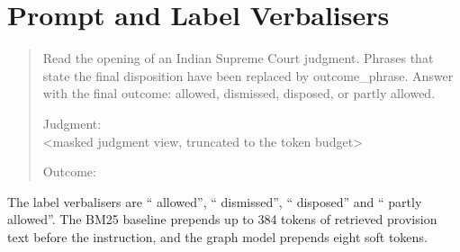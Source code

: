 \documentclass[journal]{IEEEtran}
\begin{document}
\appendices
\section{Prompt and Label Verbalisers}\label{app:prompt}
\begin{quote}\small
Read the opening of an Indian Supreme Court judgment. Phrases that state the final disposition have been replaced by outcome\_phrase. Answer with the final outcome: allowed, dismissed, disposed, or partly allowed.

Judgment:\\
\textless masked judgment view, truncated to the token budget\textgreater

Outcome:
\end{quote}
The label verbalisers are `` allowed'', `` dismissed'', `` disposed'' and `` partly allowed''. The BM25 baseline prepends up to 384 tokens of retrieved provision text before the instruction, and the graph model prepends eight soft tokens.


\end{document}
